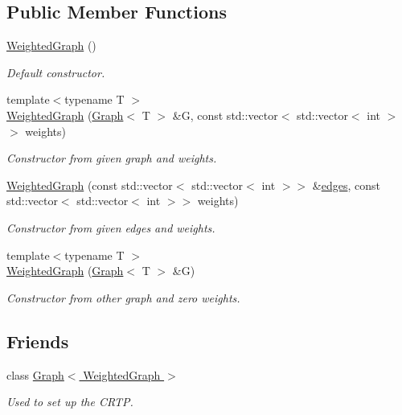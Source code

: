 \subsection*{Public Member Functions}
\begin{DoxyCompactItemize}
\item 
\hyperlink{classMackey_1_1WeightedGraph_afed3bc23878489313a0bf8770898759a}{Weighted\+Graph} ()
\begin{DoxyCompactList}\small\item\em Default constructor. \end{DoxyCompactList}\item 
{\footnotesize template$<$typename T $>$ }\\\hyperlink{classMackey_1_1WeightedGraph_a080db5a1861342bba8ba62c55a3bac95}{Weighted\+Graph} (\hyperlink{classMackey_1_1Graph}{Graph}$<$ T $>$ \&G, const std\+::vector$<$ std\+::vector$<$ int $>$$>$ weights)
\begin{DoxyCompactList}\small\item\em Constructor from given graph and weights. \end{DoxyCompactList}\item 
\hyperlink{classMackey_1_1WeightedGraph_a962738a9a66a39f7fb2005411bf56818}{Weighted\+Graph} (const std\+::vector$<$ std\+::vector$<$ int $>$$>$ \&\hyperlink{classMackey_1_1Graph_a729ec24b9f9e504f4c4e2d3f6e2cab83}{edges}, const std\+::vector$<$ std\+::vector$<$ int $>$$>$ weights)
\begin{DoxyCompactList}\small\item\em Constructor from given edges and weights. \end{DoxyCompactList}\item 
{\footnotesize template$<$typename T $>$ }\\\hyperlink{classMackey_1_1WeightedGraph_ad5932440f83ea50f802d96b44c2da5e3}{Weighted\+Graph} (\hyperlink{classMackey_1_1Graph}{Graph}$<$ T $>$ \&G)
\begin{DoxyCompactList}\small\item\em Constructor from other graph and zero weights. \end{DoxyCompactList}\end{DoxyCompactItemize}
\subsection*{Friends}
\begin{DoxyCompactItemize}
\item 
class \hyperlink{classMackey_1_1WeightedGraph_aa4863e14b8d7dcd76942894cae55e453}{Graph$<$ Weighted\+Graph $>$}
\begin{DoxyCompactList}\small\item\em Used to set up the C\+R\+TP. \end{DoxyCompactList}\end{DoxyCompactItemize}
